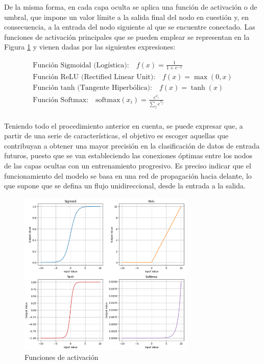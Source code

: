 \vspace{3mm}

De la misma forma, en cada capa oculta se aplica una función de activación o de umbral, que impone un valor límite a la salida final del nodo en cuestión y, en consecuencia, a la entrada del nodo siguiente al que se encuentre conectado. Las funciones de activación principales que se pueden emplear se representan en la Figura \ref{fig:functions} y vienen dadas por las siguientes expresiones: \cite{factiv} \cite{functions}

\begin{equation}
    \begin{aligned}
        \text{Función Sigmoidal (Logística):} \quad f(x) = \frac{1}{1 + e^{-x}} \\
        \text{Función ReLU (Rectified Linear Unit):} \quad f(x) = \max(0, x) \\
        \text{Función tanh (Tangente Hiperbólica):} \quad f(x) = \tanh(x) \\
        \text{Función Softmax:} \quad \text{softmax}(x_i) = \frac{e^{x_i}}{\sum_{j} e^{x_j}} \\
    \end{aligned}
\end{equation}

\pagebreak

Teniendo todo el procedimiento anterior en cuenta, se puede expresar que, a partir de una serie de características, el objetivo es escoger aquellas que contribuyan a obtener una mayor precisión en la clasificación de datos de entrada futuros, puesto que se van estableciendo las conexiones óptimas entre los nodos de las capas ocultas con un entrenamiento progresivo. Es preciso indicar que el funcionamiento del modelo se basa en una red de propagación hacia delante, lo que supone que se defina un flujo unidireccional, desde la entrada a la salida. 

\vspace{3mm}

\begin{figure}[h!]
    \centering
    \includegraphics[width=0.75\textwidth]{img/teoria/functions.png}
    \caption{Funciones de activación \cite{functions}}
    \label{fig:functions}
\end{figure}

